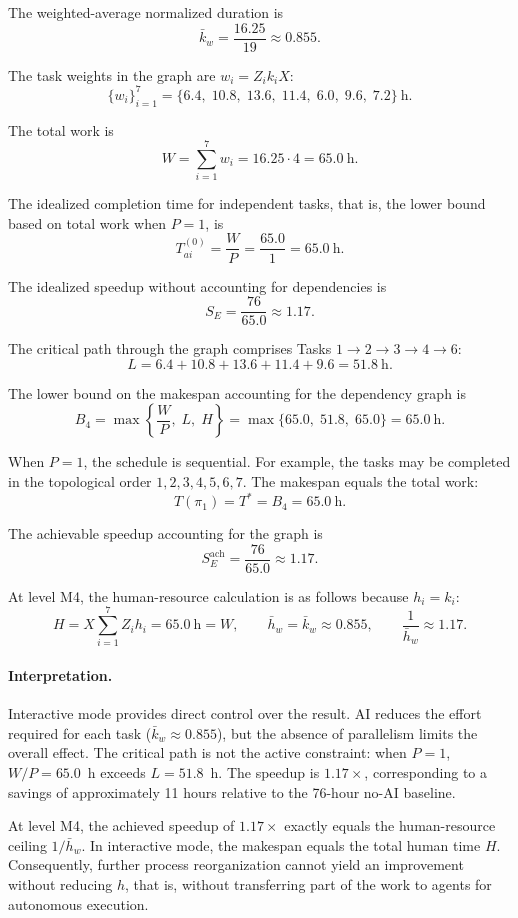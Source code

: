 The weighted-average normalized duration is
\[
  \bar{k}_w = \frac{16.25}{19} \approx 0.855.
\]

The task weights in the graph are $w_i = Z_i k_i X$:
\[
  \{w_i\}_{i=1}^{7} = \{6.4,\; 10.8,\; 13.6,\; 11.4,\; 6.0,\; 9.6,\; 7.2\}~\text{h}.
\]

The total work is
\[
  W = \sum_{i=1}^{7} w_i = 16.25 \cdot 4 = 65.0~\text{h}.
\]

The idealized completion time for independent tasks, that is, the lower bound
based on total work when $P = 1$, is
\[
  T_{ai}^{(0)} = \frac{W}{P} = \frac{65.0}{1} = 65.0~\text{h}.
\]

The idealized speedup without accounting for dependencies is
\[
  S_E = \frac{76}{65.0} \approx 1.17.
\]

The critical path through the graph comprises Tasks
$1 \to 2 \to 3 \to 4 \to 6$:
\[
  L = 6.4 + 10.8 + 13.6 + 11.4 + 9.6 = 51.8~\text{h}.
\]

The lower bound on the makespan accounting for the dependency graph is
\[
  B_4 = \max\left\{\frac{W}{P},\; L,\; H\right\} = \max\{65.0,\; 51.8,\;65.0\} = 65.0~\text{h}.
\]

When $P=1$, the schedule is sequential. For example, the tasks may be
completed in the topological order $1,2,3,4,5,6,7$. The makespan equals the
total work:
\[
  T(\pi_1)=T^{*}=B_4=65.0~\text{h}.
\]

The achievable speedup accounting for the graph is
\[
  S_E^{\text{ach}} = \frac{76}{65.0} \approx 1.17.
\]

At level M4, the human-resource calculation is as follows because $h_i = k_i$:
\[
  H = X \sum_{i=1}^{7} Z_i h_i = 65.0~\text{h} = W,
  \qquad
  \bar{h}_w = \bar{k}_w \approx 0.855,
  \qquad
  \frac{1}{\bar{h}_w} \approx 1.17.
\]

\paragraph{Interpretation.}
Interactive mode provides direct control over the result. AI reduces the
effort required for each task ($\bar{k}_w \approx 0.855$), but the absence of
parallelism limits the overall effect. The critical path is not the active
constraint: when $P=1$, $W/P=65.0$~h exceeds $L=51.8$~h. The speedup is
$1.17\times$, corresponding to a savings of approximately 11 hours relative
to the 76-hour no-AI baseline.

At level M4, the achieved speedup of $1.17\times$ exactly equals the
human-resource ceiling $1/\bar{h}_w$. In interactive mode, the makespan equals
the total human time $H$. Consequently, further process reorganization cannot
yield an improvement without reducing $h$, that is, without transferring part
of the work to agents for autonomous execution.
